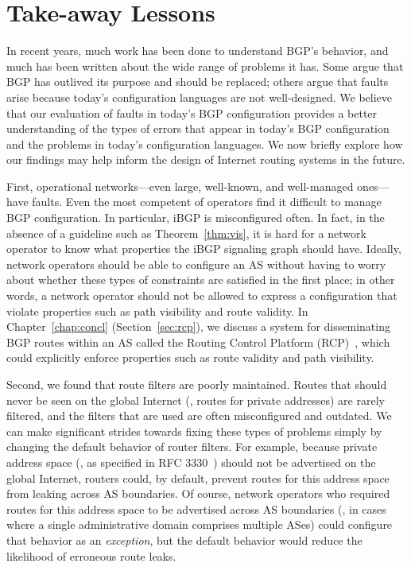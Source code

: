 \section{Take-away Lessons}\label{sec:rcc_lessons}


In recent years, much work has been done to understand BGP's
behavior, and much has been written about the wide range of problems it
has.  Some argue that BGP has outlived its purpose and should be
replaced; others argue that faults arise
because today's configuration languages are not
well-designed.  We believe that our evaluation of faults in
today's BGP configuration provides a better understanding of the
types of errors that appear in today's BGP configuration and the
problems in today's configuration languages.  
%
We now briefly explore how our findings may help inform the design
of Internet routing systems in the future.

First, operational networks---even large, well-known, and well-managed
ones---have faults.  Even the most competent of operators find it
difficult to manage BGP configuration.  In particular, iBGP is
misconfigured often.  In fact, in the absence of a guideline such as
Theorem~\ref{thm:vis}, it is hard for a network operator to know what
properties the iBGP signaling graph should have.  Ideally, network
operators should be able to configure an AS without having to worry
about whether these types of constraints are satisfied in the first
place; in other words, a network operator should not be allowed to
express a configuration that violate properties such as path visibility
and route validity.  In Chapter~\ref{chap:concl}
(Section~\ref{sec:rcp}), we discuss a system for disseminating BGP
routes within an AS called the Routing Control Platform
(RCP)~\cite{caesar2004,feamster:fdna2004}, which could explicitly
enforce properties such as route validity and path visibility.

%
Second, we found that route filters are poorly maintained.  Routes that
should never be seen on the global Internet (\eg, routes for private
addresses) are rarely filtered, and the filters that are used are often
misconfigured and outdated.  We can make significant strides towards
fixing these types of problems simply by changing the default behavior
of router filters.  For example, because private address space (\ie, as
specified in RFC 3330~\cite{rfc3330}) should not be advertised on the
global Internet, routers could, by default, prevent routes for this
address space from leaking across AS boundaries.  Of course, network
operators who required routes for this address space to be advertised
across AS boundaries (\eg, in cases where a single administrative domain
comprises multiple ASes) could configure that behavior as an {\em
exception}, but the default behavior would reduce the likelihood of
erroneous route leaks.

